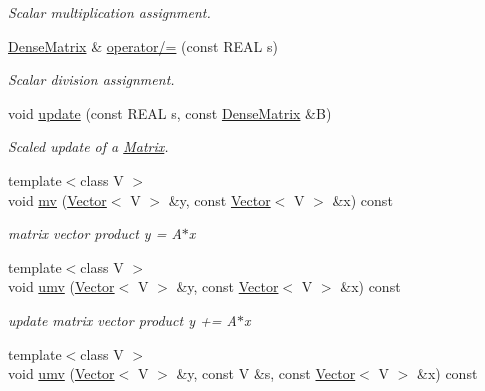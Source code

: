 \begin{DoxyCompactItemize}
\begin{DoxyCompactList}\small\item\em Scalar multiplication assignment. \item\end{DoxyCompactList}\item 
\hyperlink{classhdnum_1_1DenseMatrix}{DenseMatrix} \& \hyperlink{classhdnum_1_1DenseMatrix_a05fab8204f026598d4d97a04013ed7c5}{operator/=} (const REAL s)
\begin{DoxyCompactList}\small\item\em Scalar division assignment. \item\end{DoxyCompactList}\item 
void \hyperlink{classhdnum_1_1DenseMatrix_a60a10bbc94192242d3206df18eb0978b}{update} (const REAL s, const \hyperlink{classhdnum_1_1DenseMatrix}{DenseMatrix} \&B)
\begin{DoxyCompactList}\small\item\em Scaled update of a \hyperlink{classhdnum_1_1Matrix}{Matrix}. \item\end{DoxyCompactList}\item 
{\footnotesize template$<$class V $>$ }\\void \hyperlink{classhdnum_1_1DenseMatrix_a63a0aa62c65545ae7aeee7a44e10568e}{mv} (\hyperlink{classhdnum_1_1Vector}{Vector}$<$ V $>$ \&y, const \hyperlink{classhdnum_1_1Vector}{Vector}$<$ V $>$ \&x) const 
\begin{DoxyCompactList}\small\item\em matrix vector product y = A$\ast$x \item\end{DoxyCompactList}\item 
{\footnotesize template$<$class V $>$ }\\void \hyperlink{classhdnum_1_1DenseMatrix_a7c179eb4b54a828bf8624f3222f710ce}{umv} (\hyperlink{classhdnum_1_1Vector}{Vector}$<$ V $>$ \&y, const \hyperlink{classhdnum_1_1Vector}{Vector}$<$ V $>$ \&x) const 
\begin{DoxyCompactList}\small\item\em update matrix vector product y += A$\ast$x \item\end{DoxyCompactList}\item 
{\footnotesize template$<$class V $>$ }\\void \hyperlink{classhdnum_1_1DenseMatrix_aabf780a319d2d9d4379f8d5832c1a99c}{umv} (\hyperlink{classhdnum_1_1Vector}{Vector}$<$ V $>$ \&y, const V \&s, const \hyperlink{classhdnum_1_1Vector}{Vector}$<$ V $>$ \&x) const 

\end{DoxyCompactItemize}
